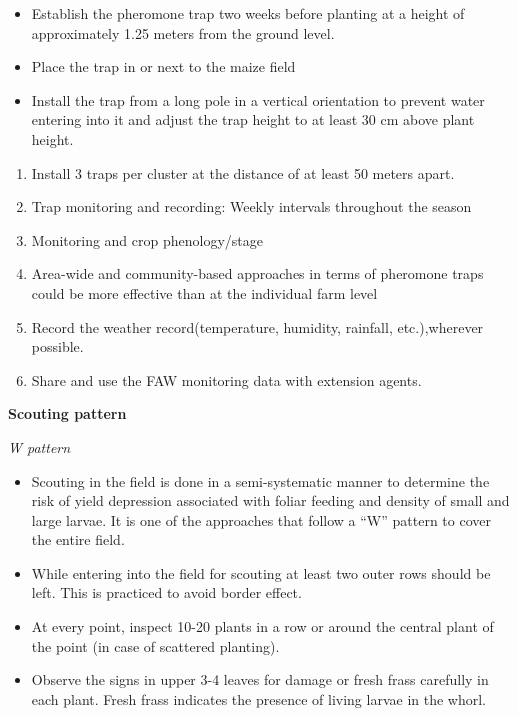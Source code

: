 \documentclass[
  openany]{book}
\providecommand{\tightlist}{%
  \setlength{\itemsep}{0pt}\setlength{\parskip}{0pt}}
\begin{document}
\begin{itemize}
\tightlist
\item
  Establish the pheromone trap two weeks before planting at a height of approximately 1.25 meters from the ground level.
\item
  Place the trap in or next to the maize field
\item
  Install the trap from a long pole in a vertical orientation to prevent water entering into it and adjust the trap height to at least 30 cm above plant height.
\end{itemize}

\begin{enumerate}
\def\labelenumi{\arabic{enumi}.}
\setcounter{enumi}{3}
\tightlist
\item
  Install 3 traps per cluster at the distance of at least 50 meters apart.
\item
  Trap monitoring and recording: Weekly intervals throughout the season
\item
  Monitoring and crop phenology/stage
\item
  Area-wide and community-based approaches in terms of pheromone traps could be more effective than at the individual farm level
\item
  Record the weather record(temperature, humidity, rainfall, etc.),wherever possible.
\item
  Share and use the FAW monitoring data with extension agents.
\end{enumerate}

\textbf{Scouting pattern}

\emph{W pattern}

\begin{itemize}
\tightlist
\item
  Scouting in the field is done in a semi-systematic manner to determine the risk of yield depression associated with foliar feeding and density of small and large larvae. It is one of the approaches that follow a ``W'' pattern to cover the entire field.
\item
  While entering into the field for scouting at least two outer rows should be left. This is practiced to avoid border effect.
\item
  At every point, inspect 10-20 plants in a row or around the central plant of the point (in case of scattered planting).
\item
  Observe the signs in upper 3-4 leaves for damage or fresh frass carefully in each plant. Fresh frass indicates the presence of living larvae in the whorl.
\end{itemize}
\end{document}
